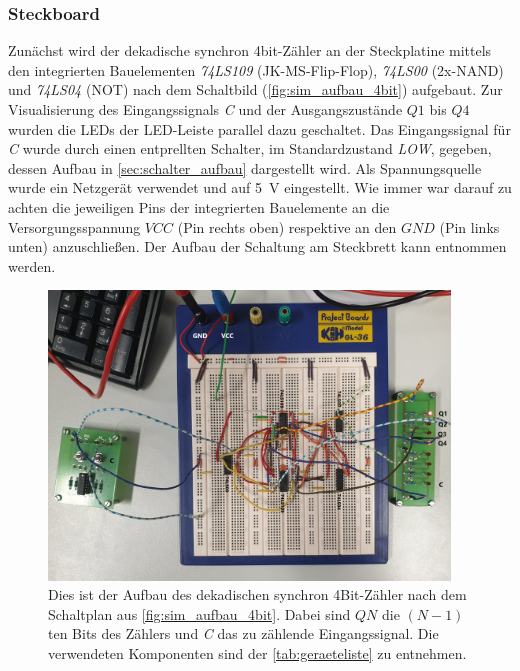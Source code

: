 \documentclass[12pt,english,ngerman]{scrartcl}
\begin{document}
\subsubsection{Steckboard}
Zunächst wird der dekadische synchron 4bit-Zähler an der Steckplatine
mittels den integrierten Bauelementen \textit{74LS109} (JK-MS-Flip-Flop), 
\textit{74LS00} (2x-NAND) und \textit{74LS04} (NOT)
nach dem Schaltbild (\autoref{fig:sim_aufbau_4bit})
aufgebaut. Zur Visualisierung des Eingangssignals \textit{C} und der
Ausgangszustände $Q1$ bis $Q4$ wurden die LEDs der LED-Leiste parallel dazu geschaltet. Das
Eingangssignal für \textit{C} wurde durch einen entprellten Schalter, im Standardzustand
\textit{LOW}, gegeben, dessen Aufbau in \autoref{sec:schalter_aufbau} dargestellt wird. Als
Spannungsquelle wurde ein Netzgerät verwendet und auf \SI{5}{\volt}
eingestellt. Wie immer war darauf zu achten die jeweiligen Pins der integrierten
Bauelemente an die Versorgungsspannung $VCC$ (Pin rechts oben) respektive 
an den $GND$ (Pin links unten) anzuschließen.
Der Aufbau der Schaltung am Steckbrett kann 
entnommen werden.

\begin{figure}[H]
  \centering
    \includegraphics[width=0.95\textwidth]{./figures/messungen/4bit/aufbau.png}
  \caption{Dies ist der Aufbau des dekadischen synchron 4Bit-Zähler nach dem
  Schaltplan aus \autoref{fig:sim_aufbau_4bit}.
Dabei sind $QN$ die $(N-1)$ten Bits des Zählers und \textit{C} das zu zählende
Eingangssignal.
  Die verwendeten Komponenten
  sind der \autoref{tab:geraeteliste} zu entnehmen.}
  \label{fig:mess_aufbau_4bit}
\end{figure}
\end{document}
